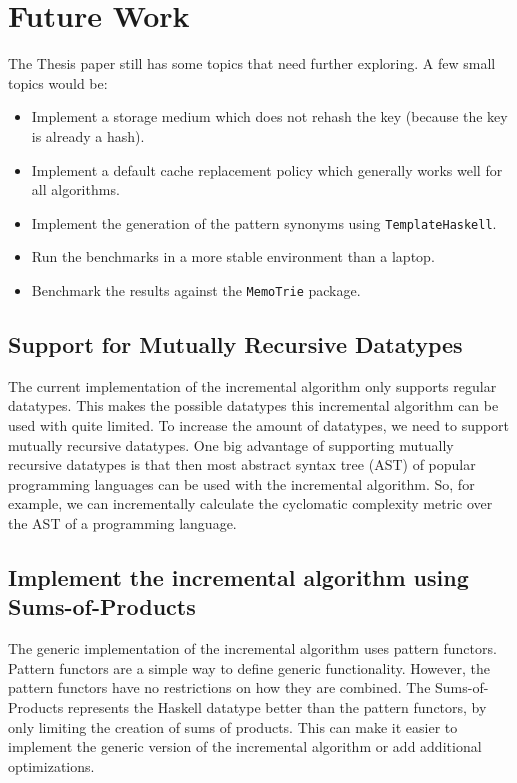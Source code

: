 \section{Future Work}

The Thesis paper still has some topics that need further exploring. A few small topics would be: 
\begin{itemize}
  \item Implement a storage medium which does not rehash the key (because the key is already a hash).
  \item Implement a default cache replacement policy which generally works well for all algorithms. 
  \item Implement the generation of the pattern synonyms using \texttt{TemplateHaskell}.
  \item Run the benchmarks in a more stable environment than a laptop.
  \item Benchmark the results against the \texttt{MemoTrie} package.
\end{itemize}

\subsection{Support for Mutually Recursive Datatypes}
The current implementation of the incremental algorithm only supports regular datatypes. This makes the possible datatypes this incremental algorithm can be used with quite limited. To increase the amount of datatypes, we need to support mutually recursive datatypes. One big advantage of supporting mutually recursive datatypes is that then most abstract syntax tree (AST) of popular programming languages can be used with the incremental algorithm. So, for example, we can incrementally calculate the cyclomatic complexity metric over the AST of a programming language. 

\pagebreak
\subsection{Implement the incremental algorithm using Sums-of-Products}
The generic implementation of the incremental algorithm uses pattern functors. Pattern functors are a simple way to define generic functionality. However, the pattern functors have no restrictions on how they are combined. The Sums-of-Products represents the Haskell datatype better than the pattern functors, by only limiting the creation of sums of products. This can make it easier to implement the generic version of the incremental algorithm or add additional optimizations.

